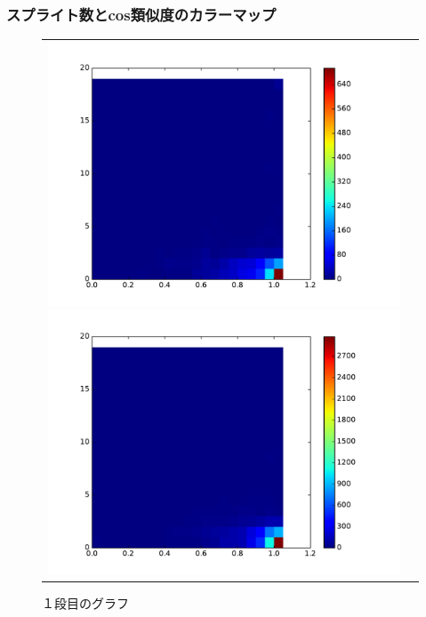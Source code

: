 \documentclass[twocolumn,9pt,a4paper]{jsarticle}
\begin{document}
\subsubsection{スプライト数とcos類似度のカラーマップ}
\begin{figure}[h]
 \begin{tabular}{cc}
 	\begin{minipage}[t]{0.45\hsize}
	 \centering
	 \includegraphics[keepaspectratio, scale = 0.2]{colormap_splite_1.pdf}
	 \caption{１段目のグラフ}
	 \label{first_splite}
	\end{minipage}
        \begin{minipage}[t]{0.45\hsize}
	 \centering
	 \includegraphics[keepaspectratio, scale = 0.2]{colormap_splite_2.pdf}

\end{minipage}
\end{tabular}
\end{figure}
\end{document}

